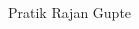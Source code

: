 \begin{titlepage}
\begin{addmargin}[-1cm]{-3cm}
        \hfill

        \cleardoublepage

        {
          \begin{flushleft}
            {\Huge {}\par}\par
            \vspace{25mm}
            Pratik Rajan Gupte
          \end{flushleft}
        }
  \end{addmargin}
\end{titlepage}

\nopagecolor
